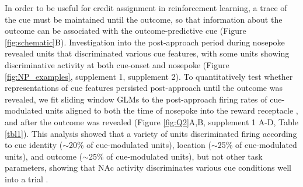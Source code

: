 \documentclass[11pt]{article}
\providecommand{\DIFadd}[1]{{\protect\color{red} \sf #1}} %
\providecommand{\DIFdel}[1]{} %
\providecommand{\DIFaddbegin}{} %
\providecommand{\DIFaddend}{} %
\providecommand{\DIFdelbegin}{} %
\providecommand{\DIFdelend}{} %
\newcommand{\DIFscaledelfig}{0.5}
\newlength{\DIFdelgraphicswidth} %
\newlength{\DIFdelgraphicsheight} %
\newcommand{\DIFaddincludegraphics}[2][]{{\color{red}\fbox{\DIFOincludegraphics[#1]{#2}}}} %
\newcommand{\DIFdelincludegraphics}[2][]{%
\sbox{\DIFdelgraphicsbox}{\DIFOincludegraphics[#1]{#2}}%
\settoboxwidth{\DIFdelgraphicswidth}{\DIFdelgraphicsbox} %
\settoboxtotalheight{\DIFdelgraphicsheight}{\DIFdelgraphicsbox} %
\scalebox{\DIFscaledelfig}{%
\parbox[b]{\DIFdelgraphicswidth}{\usebox{\DIFdelgraphicsbox}\\[-\baselineskip] \rule{\DIFdelgraphicswidth}{0em}}\llap{\resizebox{\DIFdelgraphicswidth}{\DIFdelgraphicsheight}{%
\setlength{\unitlength}{\DIFdelgraphicswidth}%
\begin{picture}(1,1)%
\thicklines\linethickness{2pt} %
{\color[rgb]{1,0,0}\put(0,0){\framebox(1,1){}}}%
{\color[rgb]{1,0,0}\put(0,0){\line( 1,1){1}}}%
{\color[rgb]{1,0,0}\put(0,1){\line(1,-1){1}}}%
\end{picture}%
}\hspace*{3pt}}} %
} %
\DeclareRobustCommand{\DIFaddbegin}{\DIFOaddbegin \let\includegraphics\DIFaddincludegraphics} %
\DeclareRobustCommand{\DIFaddend}{\DIFOaddend \let\includegraphics\DIFOincludegraphics} %
\DeclareRobustCommand{\DIFdelbegin}{\DIFOdelbegin \let\includegraphics\DIFdelincludegraphics} %
\DeclareRobustCommand{\DIFdelend}{\DIFOaddend \let\includegraphics\DIFOincludegraphics} %
\begin{document}
In order to be useful for credit assignment in reinforcement learning, a trace of the cue must be maintained until the outcome, so that information about the outcome can be associated with the outcome-predictive cue \DIFdelbegin \DIFdel{. To }\DIFdelend \DIFaddbegin \DIFadd{(Figure \ref{fig:schematic}B). Investigation into the post-approach period during nosepoke revealed units that discriminated various cue features, with some units showing discriminative activity at both cue-onset and nosepoke (Figure \ref{fig:NP_examples}, supplement 1, supplement 2). To quantitatively }\DIFaddend test whether representations of cue features persisted post-approach until the outcome was revealed, we fit \DIFdelbegin \DIFdel{a GLM }\DIFdelend \DIFaddbegin \DIFadd{sliding window GLMs }\DIFaddend to the post-approach firing rates of cue-modulated units aligned to \DIFaddbegin \DIFadd{both }\DIFaddend the time of nosepoke into the reward receptacle\DIFaddbegin \DIFadd{, and after the outcome was revealed (Figure \ref{fig:Q2}A,B, supplement 1 A-D, Table \ref{tbl1})}\DIFaddend . This analysis showed that a variety of units \DIFdelbegin \DIFdel{still }\DIFdelend discriminated firing according to \DIFdelbegin \DIFdel{various
cue features, }\DIFdelend \DIFaddbegin \DIFadd{cue identity ($\sim$20\% of cue-modulated units), location ($\sim$25\% of cue-modulated units), and outcome ($\sim$25\% of cue-modulated units), }\DIFaddend but not other task parameters, showing that NAc activity discriminates various cue conditions well into a trial\DIFdelbegin \DIFdel{(Table \ref{tbl1},
Figures \ref{fig:NP_examples},\ref{fig:NP_GLM}).
Additionally, these units were
a mix between most of the units that encoded }\DIFdelend \DIFaddbegin \DIFadd{.
}
\end{document}
